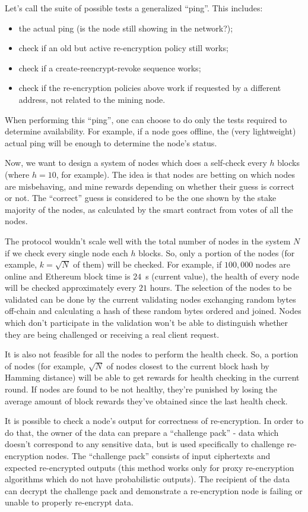 \documentclass[longbibliography,nofootinbib]{revtex4-1}
\begin{document}
Let's call the suite of possible tests a generalized ``ping''.
This includes:
\begin{itemize}
    \item the actual ping (is the node still showing in the network?);
    \item check if an old but active re-encryption policy still works;
    \item check if a create-reencrypt-revoke sequence works;
    \item check if the re-encryption policies above work if requested by a different address, not related to the mining node.
\end{itemize}
When performing this ``ping'', one can choose to do only the tests required to determine availability.
For example, if a node goes offline, the (very lightweight) actual ping will be enough to determine the node's status.

Now, we want to design a system of nodes which does a self-check every $h$ blocks (where $h=10$, for example).
The idea is that nodes are betting on which nodes are misbehaving, and mine rewards depending on whether their guess is correct or not.
The ``correct'' guess is considered to be the one shown by the stake majority of the nodes, as calculated by the smart contract from votes of all the nodes.

The protocol wouldn't scale well with the total number of nodes in the system $N$ if we check every single node each $h$ blocks.
So, only a portion of the nodes (for example, $k=\sqrt{N}$ of them) will be checked.
For example, if $100,000$ nodes are online and Ethereum block time is $24$~s (current value), the health of every node will be checked approximately every $21$
hours.
The selection of the nodes to be validated can be done by the current validating nodes exchanging random bytes off-chain and calculating a hash of these
random bytes ordered and joined.
Nodes which don't participate in the validation won't be able to distinguish whether they are being challenged or receiving a real client request.

It is also not feasible for all the nodes to perform the health check.
So, a portion of nodes (for example, $\sqrt{N}$ of nodes closest to the current block hash by Hamming distance) will be able to get rewards for health checking
in the current round.
If nodes are found to be not healthy, they're punished by losing the average amount of block rewards they've obtained since the last health check.

It is possible to check a node's output for correctness of re-encryption.
In order to do that, the owner of the data can prepare a ``challenge pack'' - data which doesn't correspond to any sensitive data, but is used specifically to
challenge re-encryption nodes.
The ``challenge pack'' consists of input ciphertexts and expected re-encrypted outputs
(this method works only for proxy re-encryption algorithms which do not have probabilistic outputs).
The recipient of the data can decrypt the challenge pack and demonstrate a re-encryption node is failing or unable to properly re-encrypt data.
\end{document}
